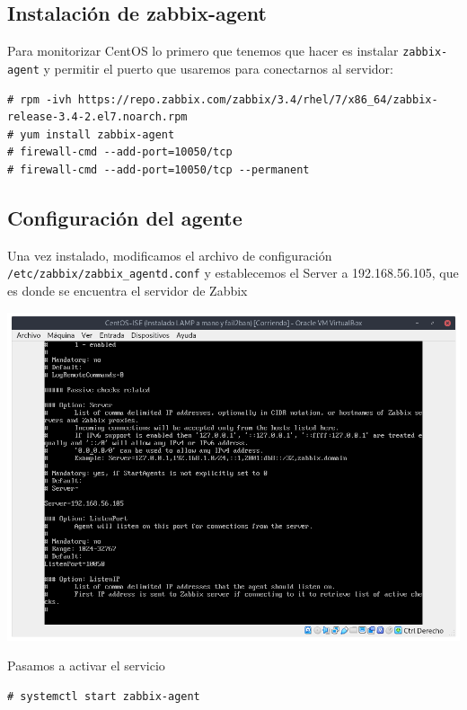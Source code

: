 \documentclass[12pt, spanish]{article}
\begin{document}
\subsection{Instalación de zabbix-agent}
Para monitorizar CentOS lo primero que tenemos que hacer es instalar \texttt{zabbix-agent} y permitir el puerto que usaremos para conectarnos al servidor:

\begin{verbatim}
# rpm -ivh https://repo.zabbix.com/zabbix/3.4/rhel/7/x86_64/zabbix-release-3.4-2.el7.noarch.rpm
# yum install zabbix-agent
# firewall-cmd --add-port=10050/tcp
# firewall-cmd --add-port=10050/tcp --permanent
\end{verbatim}

\subsection{Configuración del agente}
Una vez instalado, modificamos el archivo de configuración \texttt{/etc/zabbix/zabbix\_agentd.conf} y establecemos el Server a 192.168.56.105, que es donde se encuentra el servidor de Zabbix
\begin{center}
\includegraphics[scale=0.25]{centos_conf.png}
\end{center}


Pasamos a activar el servicio
\begin{verbatim}
# systemctl start zabbix-agent
\end{verbatim}
\end{document}
